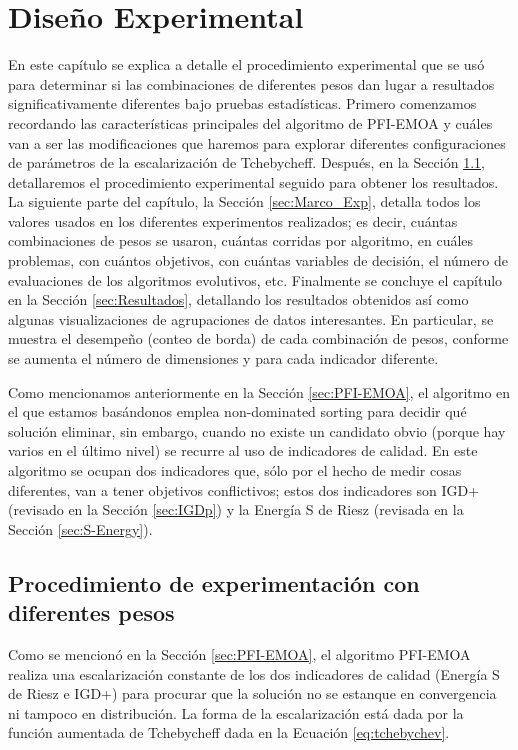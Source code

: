 
\chapter{Diseño Experimental}

En este capítulo se explica a detalle el procedimiento experimental que se usó para determinar si las combinaciones de diferentes pesos dan lugar a resultados significativamente diferentes bajo pruebas estadísticas.  Primero comenzamos recordando las características principales del algoritmo de PFI-EMOA y cuáles van a ser las modificaciones que haremos para explorar diferentes configuraciones de parámetros de la escalarización de Tchebycheff. Después, en la Sección \ref{sec:Proc_exp}, detallaremos el procedimiento experimental seguido para obtener los resultados. La siguiente parte del capítulo, la Sección \ref{sec:Marco_Exp}, detalla todos los valores usados en los diferentes experimentos realizados; es decir, cuántas combinaciones de pesos se usaron, cuántas corridas por algoritmo, en cuáles problemas, con cuántos objetivos, con cuántas variables de decisión, el número de evaluaciones de los algoritmos evolutivos, etc. Finalmente se concluye el capítulo en la Sección \ref{sec:Resultados}, detallando los resultados obtenidos así como algunas visualizaciones de agrupaciones de datos interesantes. En particular, se muestra el desempeño (conteo de borda) de cada combinación de pesos, conforme se aumenta el número de dimensiones y para cada indicador diferente. 


Como mencionamos anteriormente en la Sección \ref{sec:PFI-EMOA}, el algoritmo en el que estamos basándonos \cite{PFI} emplea non-dominated sorting para decidir qué solución eliminar, sin embargo, cuando no existe un candidato obvio (porque hay varios en el último nivel) se recurre al uso de indicadores de calidad. En este algoritmo se ocupan dos indicadores que, sólo por el hecho de medir cosas diferentes, van a tener objetivos conflictivos; estos dos indicadores son IGD+ (revisado en la Sección \ref{sec:IGDp}) y la Energía S de Riesz (revisada en la Sección \ref{sec:S-Energy}). 


\section{Procedimiento de experimentación con diferentes pesos} \label{sec:Proc_exp}

Como se mencionó en la Sección \ref{sec:PFI-EMOA}, el algoritmo PFI-EMOA \cite{PFI} realiza una escalarización constante de los dos indicadores de calidad (Energía S de Riesz e IGD+) para procurar que la solución no se estanque en convergencia ni tampoco en distribución. La forma de la escalarización está dada por la función aumentada de Tchebycheff dada en la Ecuación \ref{eq:tchebychev}.

